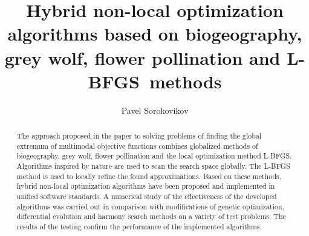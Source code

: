 \begin{englishtitle} %
\title{Hybrid non-local optimization algorithms based on biogeography, grey wolf, flower pollination and L-BFGS~methods}
\author{Pavel Sorokovikov
}

\maketitle

\begin{abstract}
The approach proposed in the paper to solving problems of finding the global extremum of multimodal objective functions combines globalized methods of biogeography, grey wolf, flower pollination and the local optimization method L-BFGS. Algorithms inspired by nature are used to scan the search space globally. The L-BFGS method is used to locally refine the found approximations. Based on these methods, hybrid non-local optimization algorithms have been proposed and implemented in unified software standards. A numerical study of the effectiveness of the developed algorithms was carried out in comparison with modifications of genetic optimization, differential evolution and harmony search methods on a variety of test problems. The results of the testing confirm the performance of the implemented algorithms.

\end{abstract}
\end{englishtitle}


\iffalse
%
%


\documentclass[12pt]{llncs}


\usepackage{iftex}

\ifPDFTeX
\usepackage[T2A]{fontenc}
\usepackage[utf8]{inputenc} %
\usepackage[english,russian]{babel}
\fi

